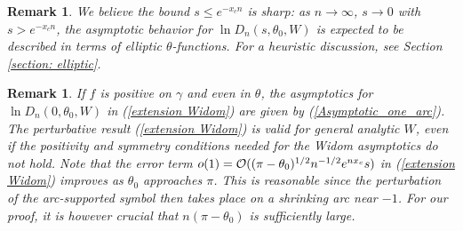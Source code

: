 \documentclass[11pt,fleqn]{article}
\numberwithin{equation}{section}
\def\bigO{{\cal O}}
\newtheorem{Remark}[theorem]{Remark}
\newenvironment{remark}{\begin{Remark}\rm}{\end{Remark}}
\begin{document}
\begin{remark}\label{remark: elliptic}
We believe the bound $s\leq e^{-x_cn}$ is sharp: as $n\to\infty$, $s\to 0$ with $s>e^{-x_cn}$, the asymptotic behavior for $\ln D_n(s,\theta_0,W)$ is expected to be described in terms of elliptic $\theta$-functions. 
For a heuristic discussion, see Section \ref{section: elliptic}.
\end{remark}
\begin{remark}
If $f$ is positive on $\gamma$ and even in $\theta$, the asymptotics for $\ln D_n(0,\theta_0,W)$ in (\ref{extension Widom}) are given by (\ref{Asymptotic_one_arc}). 
The perturbative result (\ref{extension Widom}) is valid for general analytic $W$, even if the positivity and symmetry conditions needed for the Widom asymptotics do not hold. Note that the error term $o(1)=\bigO((\pi-\theta_0)^{1/2}n^{-1/2}e^{nx_c}s)$ in (\ref{extension Widom}) improves as $\theta_0$ approaches $\pi$. This is reasonable since the perturbation of the arc-supported symbol then takes place on a shrinking arc near $-1$. For our proof, it is however crucial that $n(\pi-\theta_0)$ is sufficiently large.
\end{remark}
\end{document}
